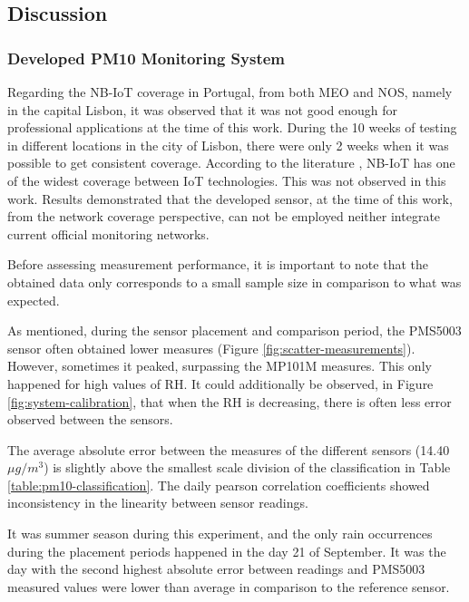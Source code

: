 \subsection{Discussion}


\subsubsection{Developed PM10 Monitoring System}

Regarding the NB-IoT coverage in Portugal, from both MEO and NOS, namely in the capital Lisbon, it was observed that it was not good enough for professional applications at the time of this work. During the 10 weeks of testing in different locations in the city of Lisbon, there were only 2 weeks when it was possible to get consistent coverage. According to the literature \cite{Lauridsen2017}, NB-IoT has one of the widest coverage between IoT technologies. This was not observed in this work. Results demonstrated that the developed sensor, at the time of this work, from the network coverage perspective, can not be employed neither integrate current official monitoring networks.

Before assessing measurement performance, it is important to note that the obtained data only corresponds to a small sample size in comparison to what was expected.


As mentioned, during the sensor placement and comparison period, the PMS5003 sensor often obtained lower measures (Figure \ref{fig:scatter-measurements}). However, sometimes it peaked, surpassing the MP101M measures. This only happened for high values of RH. It could additionally be observed, in Figure \ref{fig:system-calibration}, that when the RH is decreasing, there is often less error observed between the sensors.

The average absolute error between the measures of the different sensors (14.40 $\mu g/m^3$) is slightly above the smallest scale division of the classification in Table \ref{table:pm10-classification}. The daily pearson correlation coefficients showed inconsistency in the linearity between sensor readings.

It was summer season during this experiment, and the only rain occurrences during the placement periods happened in the day 21 of September. It was the day with the second highest absolute error between readings and PMS5003 measured values were lower than average in comparison to the reference sensor.

